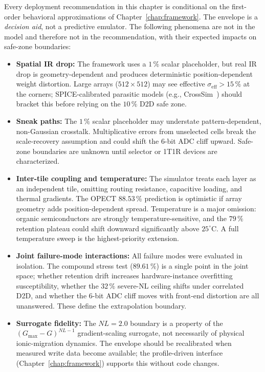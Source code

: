 Every deployment recommendation in this chapter is conditional on the first-order behavioral approximations of Chapter~\ref{chap:framework}.  The envelope is a \emph{decision aid}, not a predictive emulator.  The following phenomena are not in the model and therefore not in the recommendation, with their expected impacts on safe-zone boundaries:

\begin{itemize}
    \item \textbf{Spatial IR drop:} The framework uses a $1\,\%$ scalar placeholder, but real IR drop is geometry-dependent and produces deterministic position-dependent weight distortion.  Large arrays ($512 \times 512$) may see effective $\sigma_{\mathrm{eff}} > 15\,\%$ at the corners; SPICE-calibrated parasitic models (e.g., CrossSim~\citep{crosssim2026}) should bracket this before relying on the $10\,\%$ D2D safe zone.
    \item \textbf{Sneak paths:} The $1\,\%$ scalar placeholder may understate pattern-dependent, non-Gaussian crosstalk.  Multiplicative errors from unselected cells break the scale-recovery assumption and could shift the 6-bit ADC cliff upward.  Safe-zone boundaries are unknown until selector or 1T1R devices are characterized.
    \item \textbf{Inter-tile coupling and temperature:} The simulator treats each layer as an independent tile, omitting routing resistance, capacitive loading, and thermal gradients.  The OPECT $88.53\,\%$ prediction is optimistic if array geometry adds position-dependent spread.  Temperature is a major omission: organic semiconductors are strongly temperature-sensitive, and the $79\,\%$ retention plateau could shift downward significantly above $25^{\circ}$C.  A full temperature sweep is the highest-priority extension.
    \item \textbf{Joint failure-mode interactions:} All failure modes were evaluated in isolation.  The compound stress test ($89.61\,\%$) is a single point in the joint space; whether retention drift increases hardware-instance overfitting susceptibility, whether the $32\,\%$ severe-NL ceiling shifts under correlated D2D, and whether the 6-bit ADC cliff moves with front-end distortion are all unanswered.  These define the extrapolation boundary.
    \item \textbf{Surrogate fidelity:} The $NL=2.0$ boundary is a property of the $(G_{\max}-G)^{NL-1}$ gradient-scaling surrogate, not necessarily of physical ionic-migration dynamics.  The envelope should be recalibrated when measured write data become available; the profile-driven interface (Chapter~\ref{chap:framework}) supports this without code changes.
\end{itemize}

